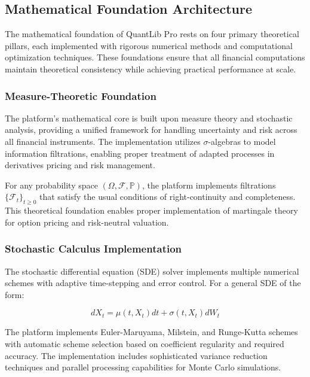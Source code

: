 \documentclass[12pt,a4paper]{article}
\theoremstyle{definition}
\theoremstyle{remark}
\begin{document}
\subsection{Mathematical Foundation Architecture}

The mathematical foundation of QuantLib Pro rests on four primary theoretical pillars, each implemented with rigorous numerical methods and computational optimization techniques. These foundations ensure that all financial computations maintain theoretical consistency while achieving practical performance at scale.

\subsubsection{Measure-Theoretic Foundation}

The platform's mathematical core is built upon measure theory and stochastic analysis, providing a unified framework for handling uncertainty and risk across all financial instruments. The implementation utilizes $\sigma$-algebras to model information filtrations, enabling proper treatment of adapted processes in derivatives pricing and risk management.

For any probability space $(\Omega, \mathcal{F}, \mathbb{P})$, the platform implements filtrations $\{\mathcal{F}_t\}_{t \geq 0}$ that satisfy the usual conditions of right-continuity and completeness. This theoretical foundation enables proper implementation of martingale theory for option pricing and risk-neutral valuation.

\subsubsection{Stochastic Calculus Implementation}

The stochastic differential equation (SDE) solver implements multiple numerical schemes with adaptive time-stepping and error control. For a general SDE of the form:

\begin{equation}
dX_t = \mu(t, X_t)dt + \sigma(t, X_t)dW_t
\end{equation}

The platform implements Euler-Maruyama, Milstein, and Runge-Kutta schemes with automatic scheme selection based on coefficient regularity and required accuracy. The implementation includes sophisticated variance reduction techniques and parallel processing capabilities for Monte Carlo simulations.
\end{document}
